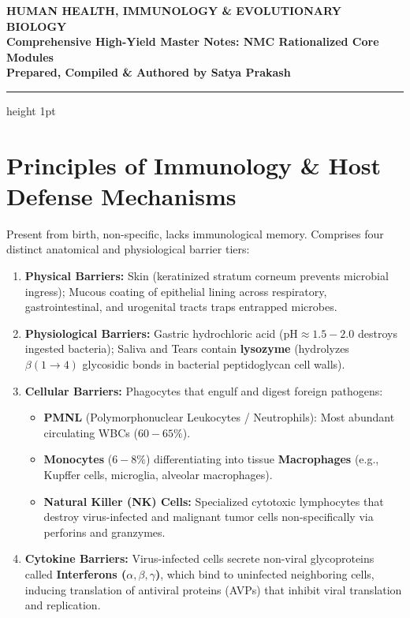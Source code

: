 \documentclass[10pt,a4paper]{article}
\begin{document}
\begin{center}
  {\LARGE \textbf{HUMAN HEALTH, IMMUNOLOGY \& EVOLUTIONARY BIOLOGY}}\\[4pt]
  {\large \textbf{Comprehensive High-Yield Master Notes: NMC Rationalized Core Modules}}\\[6pt]
  \textbf{Prepared, Compiled \& Authored by Satya Prakash}
\end{center}

\vspace{-4pt}
\hrule height 1pt
\vspace{8pt}

\section{Principles of Immunology \& Host Defense Mechanisms}

\begin{conceptbox}
Present from birth, non-specific, lacks immunological memory. Comprises four distinct anatomical and physiological barrier tiers:
\begin{enumerate}[leftmargin=*]
  \item \textbf{Physical Barriers:} Skin (keratinized stratum corneum prevents microbial ingress); Mucous coating of epithelial lining across respiratory, gastrointestinal, and urogenital tracts traps entrapped microbes.
  \item \textbf{Physiological Barriers:} Gastric hydrochloric acid ($\mathrm{pH} \approx 1.5-2.0$ destroys ingested bacteria); Saliva and Tears contain \textbf{lysozyme} (hydrolyzes $\beta(1\to 4)$ glycosidic bonds in bacterial peptidoglycan cell walls).
  \item \textbf{Cellular Barriers:} Phagocytes that engulf and digest foreign pathogens:
  \begin{itemize}
    \item \textbf{PMNL} (Polymorphonuclear Leukocytes / Neutrophils): Most abundant circulating WBCs ($60-65\%$).
    \item \textbf{Monocytes} ($6-8\%$) differentiating into tissue \textbf{Macrophages} (e.g., Kupffer cells, microglia, alveolar macrophages).
    \item \textbf{Natural Killer (NK) Cells:} Specialized cytotoxic lymphocytes that destroy virus-infected and malignant tumor cells non-specifically via perforins and granzymes.
  \end{itemize}
  \item \textbf{Cytokine Barriers:} Virus-infected cells secrete non-viral glycoproteins called \textbf{Interferons ($\alpha, \beta, \gamma$)}, which bind to uninfected neighboring cells, inducing translation of antiviral proteins (AVPs) that inhibit viral translation and replication.
\end{enumerate}
\end{conceptbox}
\end{document}
